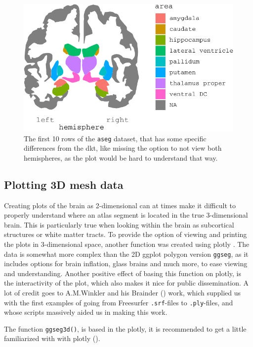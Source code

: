 \documentclass[fleqn,10pt]{wlpeerj} %
\begin{document}
\begin{figure}
\centering
\includegraphics{draft_1_files/figure-latex/atlases-1.pdf}
\caption{\label{fig:atlases}The first 10 rows of the \texttt{aseg} dataset, that has some specific differences from the dkt, like missing the option to not view both hemispheres, as the plot would be hard to understand that way.}
\end{figure}

\hypertarget{plotting-3d-mesh-data}{%
\subsection{Plotting 3D mesh data}\label{plotting-3d-mesh-data}}

Creating plots of the brain as 2-dimensional can at times make it difficult to properly understand where an atlas segment is located in the true 3-dimensional brain.
This is particularly true when looking within the brain as subcortical structures or white matter tracts.
To provide the option of viewing and printing the plots in 3-dimensional space, another function was created using plotly \citep{plotly}.
The data is somewhat more complex than the 2D ggplot polygon version \texttt{ggseg}, as it includes options for brain inflation, glass brains and much more, to ease viewing and understanding.
Another positive effect of basing this function on plotly, is the interactivity of the plot, which also makes it nice for public dissemination.
A lot of credit goes to A.M.Winkler and his Brainder (\citet{brainder}) work, which supplied us with the first examples of going from Freesurfer \texttt{.srf}-files to \texttt{.ply}-files, and whose scripts massively aided us in making this work.

The function \texttt{ggseg3d()}, is based in the plotly, it is recommended to get a little familiarized with with plotly (\citet{plotly}).
\end{document}
